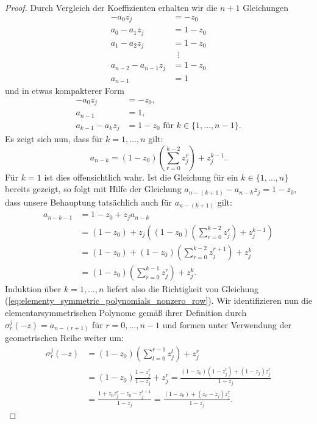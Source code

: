 \begin{proof}
    \noindent Durch Vergleich der Koeffizienten erhalten wir die $n+1$
    Gleichungen
    \begin{equation*}
        \begin{split}
            -a_0 z_j              &= -z_0\\
            a_0 - a_1 z_j         &= 1 - z_0\\
            a_1 - a_2 z_j         &= 1 - z_0\\
                                  &\;\; \vdots\\
            a_{n-2} - a_{n-1} z_j &= 1 - z_0\\
            a_{n-1}               &= 1
        \end{split}
    \end{equation*}
    und in etwas kompakterer Form
    \[
        \begin{split}
            -a_0 z_j            &= -z_0, \\
            a_{n-1}             &= 1, \\
            a_{k-1} - a_{k} z_j &= 1 - z_0 \text{ für } k \in \{1, \dots, n-1\}.
        \end{split}
    \]
    Es zeigt sich nun, dass für $k=1, \dots, n$ gilt:
    \begin{equation}
        \label{eq:elementy_symmetric_polynomials_nonzero_row}
        a_{n-k}
        = (1 - z_0) \left( \sum_{r=0}^{k-2} z_j^r \right) + z_j^{k-1}.
    \end{equation}
    Für $k=1$ ist dies offensichtlich wahr.
    Ist die Gleichung für ein $k \in \{1, \dots, n\}$ bereits gezeigt, so folgt
    mit Hilfe der Gleichung
    $a_{n-(k+1)} - a_{n-k} z_j = 1 - z_0$, dass unsere Behauptung tatsächlich
    auch für $a_{n-(k+1)}$ gilt:
    \[
        \begin{split}
            a_{n-k-1}
            &= 1-z_0 + z_j a_{n-k}\\
            &= (1-z_0) + z_j \left( (1 - z_0) \left( \sum_{r=0}^{k-2} z_j^r \right) + z_j^{k-1} \right)\\
            &= (1-z_0) + (1 - z_0) \left( \sum_{r=0}^{k-2} z_j^{r+1} \right) + z_j^{k}\\
            &= (1 - z_0) \left( \sum_{r=0}^{k-1} z_j^r \right) + z_j^{k}.
        \end{split}
    \]
    Induktion über $k = 1, \dots, n$ liefert also die Richtigkeit von Gleichung
    (\ref{eq:elementy_symmetric_polynomials_nonzero_row}).
    Wir identifizieren nun die elementarsymmetrischen Polynome gemäß ihrer
    Definition durch
    ${\sigma_r^j(-z) = a_{n-(r+1)}}$ für $r=0, \dots, n-1$ und
    formen unter Verwendung der geometrischen Reihe weiter um:
    \[
        \begin{split}
            \sigma_r^j(-z)
            &= (1 - z_0) \left( \sum_{l=0}^{r-1} z_j^l \right) + z_j^{r}\\
            &= (1 - z_0) \frac{1-z_j^r}{1-z_j} + z_j^{r}
            = \frac{(1-z_0)(1-z_j^r) + (1-z_j) z_j^r}{1-z_j}\\
            &= \frac{1 + z_0 z_j^r - z_0 - z_j^{r+1}}{1-z_j}
            = \frac{(1 - z_0) + (z_0 - z_j) z_j^r}{1-z_j}.
        \end{split}
    \]


\end{proof}
